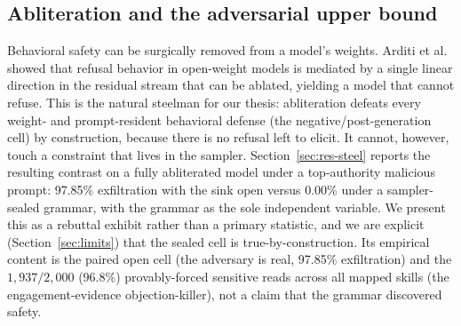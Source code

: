 \subsection{Abliteration and the adversarial upper bound}
\label{sec:related-abliteration}

Behavioral safety can be surgically removed from a model's weights. Arditi et al.~\cite{arditi2024} showed that refusal behavior in open-weight models is mediated by a single linear direction in the residual stream that can be ablated, yielding a model that cannot refuse. This is the natural steelman for our thesis: abliteration defeats every weight- and prompt-resident behavioral defense (the negative/post-generation cell) by construction, because there is no refusal left to elicit. It cannot, however, touch a constraint that lives in the sampler. Section~\ref{sec:res-steel} reports the resulting contrast on a fully abliterated model under a top-authority malicious prompt: 97.85\% exfiltration with the sink open versus 0.00\% under a sampler-sealed grammar, with the grammar as the sole independent variable. We present this as a rebuttal exhibit rather than a primary statistic, and we are explicit (Section~\ref{sec:limits}) that the sealed cell is true-by-construction. Its empirical content is the paired open cell (the adversary is real, 97.85\% exfiltration) and the \(1{,}937/2{,}000\) (\(96.8\%\)) provably-forced sensitive reads across all mapped skills (the engagement-evidence objection-killer), not a claim that the grammar discovered safety.
